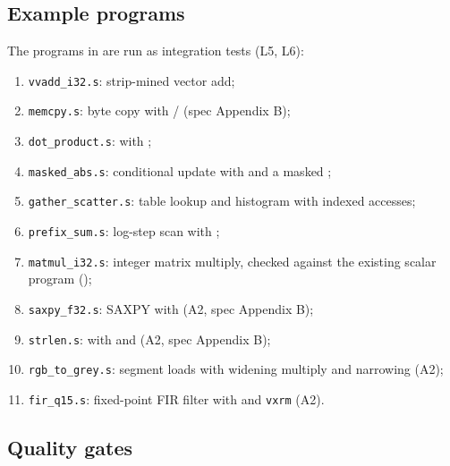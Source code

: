 \documentclass[11pt]{article}
\begin{document}
\subsection{Example programs}\label{sec:examples}

The programs in  are run as integration tests (L5, L6):

\begin{enumerate}[label=E\arabic*,leftmargin=1cm]
\item \texttt{vvadd\_i32.s}: strip-mined vector add;
\item \texttt{memcpy.s}: byte copy with / (spec Appendix B);
\item \texttt{dot\_product.s}:  with ;
\item \texttt{masked\_abs.s}: conditional update with  and a masked ;
\item \texttt{gather\_scatter.s}: table lookup and histogram with indexed accesses;
\item \texttt{prefix\_sum.s}: log-step scan with ;
\item \texttt{matmul\_i32.s}: integer matrix multiply, checked against the existing scalar program ();
\item \texttt{saxpy\_f32.s}: SAXPY with  (A2, spec Appendix B);
\item \texttt{strlen.s}:  with  and  (A2, spec Appendix B);
\item \texttt{rgb\_to\_grey.s}: segment loads  with widening multiply and narrowing (A2);
\item \texttt{fir\_q15.s}: fixed-point FIR filter with  and \texttt{vxrm} (A2).
\end{enumerate}

\subsection{Quality gates}\label{sec:gates}
\end{document}
